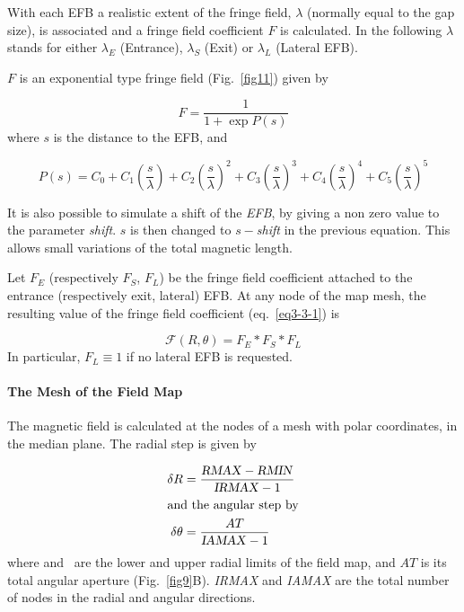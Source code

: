 \noindent With  each EFB a realistic extent of the fringe field, $\lambda $ 
(normally equal to the gap size), is associated and a fringe field coefficient
$ F $ is calculated. In the following $\lambda$ stands for either $ \lambda_ E $
(Entrance), $ \lambda_ S $ (Exit) or $ \lambda_ L $ (Lateral EFB).  
\bigskip

\noindent$ F $ is an exponential type fringe field (Fig.~\ref{fig11}) 
given by~\cite{Biblio12}     %

$$ F = \dfrac{1 }{ 1+ \exp P(s)} $$
%
 where $ s $ is the distance to the EFB, and 

$$
    P(s) = C_0
       +C_1 \left(  \dfrac{s }{ \lambda} \right) 
       +C_2 \left( \dfrac{s }{ \lambda} \right)^2 
       + C_3 \left( \dfrac{s }{ \lambda} \right)^3 
       +C_4 \left( \dfrac{s }{ \lambda} \right)^4 
       + C_5 \left(\dfrac{s }{ \lambda} \right)^5 $$
       
\noindent It is also possible to simulate a shift of the \textsl{EFB}, by giving a non
zero value to the parameter \textsl{shift}.  $ s $ is then changed to $ s -$\textsl{shift} in the 
previous equation.   This allows small variations of the total magnetic length.  
\bigskip

\noindent Let $ F_E $ (respectively $ F_S$, $F_L$)  be the fringe field
coefficient attached to the entrance (respectively exit, lateral) EFB. At any node of the map 
mesh, the resulting value of the fringe field coefficient (eq.~\ref{eq3-3-1}) is

$$  \mathcal{F}(R,\theta) = F_E  \ast  F_S \ast   F_L $$
%
In particular, $F_L\equiv 1 $  if no lateral EFB is requested. 

\paragraph{The Mesh of the Field Map} 

\noindent The magnetic field is calculated at the nodes of a mesh with polar
coordinates, in the median plane.  The radial step is given by 

 \begin{align*}
	 \delta R & = \dfrac{\text{\textsl{RMAX}} - \text{\textsl{RMIN}} }{\text{\textsl{IRMAX}}-1} \\
	\intertext{and the angular step by} 
	 \delta \theta  & = \dfrac{AT }{\text{\textsl{IAMAX}}-1} 
 \end{align*}
\noindent where \RMIN  and \RMAX\   are the lower and upper
radial limits of the field map, and $ AT $ is its total angular aperture (Fig.~\ref{fig9}B).  
 \textsl{IRMAX}  and \textsl{IAMAX} are 
the total number of nodes in the radial and angular directions. 

